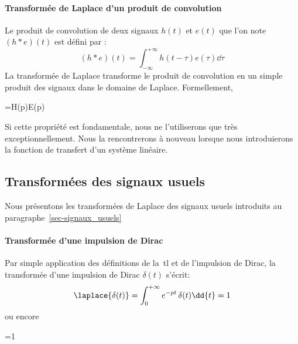 \paragraph{Transformée de Laplace d'un produit de convolution}
Le produit de convolution de deux signaux $h(t)$ et $e(t)$ que l'on 
note $(h*e)(t)$ est défini par :
$$
(h*e)(t)=\int_{-\infty}^{+\infty}h(t-\tau)e(\tau)\dd{\tau}
$$
La transformée de Laplace transforme le produit de convolution en un simple
produit des signaux dans le domaine de Laplace. Formellement,
\begin{bequation}
    =H(p)E(p)
\end{bequation}
Si cette propriété est fondamentale, nous ne l'utiliserons 
que très exceptionnellement. Nous la rencontrerons à nouveau 
lorsque nous introduierons la fonction de transfert d'un système linéaire.

\subsection{Transformées des signaux usuels}
Nous présentons les transformées de Laplace des signaux usuels introduits
au paragraphe~\ref{sec-signaux_usuels}

\paragraph{Transformée d'une impulsion de Dirac}
Par simple application des définitions 
de la~\gls{tl} et de l'impulsion de Dirac, la transformée d'une 
impulsion de Dirac $\delta(t)$ s'écrit:
$$
\laplace{\delta(t)}=\int_{0}^{+\infty} e^{-pt}\,\delta(t)\dd{t}=1
$$
ou encore
\begin{bequation}
    =1
\end{bequation}

